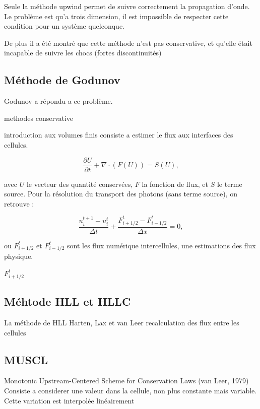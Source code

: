 Seule la méthode upwind permet de suivre correctement la propagation d'onde.
Le problème est qu'a trois dimension, il est impossible de respecter cette condition pour un système quelconque.


De plus il a été montré que cette méthode n'est pas conservative, et qu'elle était incapable de suivre les chocs (fortes discontinuités)

\subsection{Méthode de Godunov}


Godunov  \cite{MR0119433} a répondu a ce problème.

methodes conservative

introduction aux volumes finis
consiste a estimer le flux aux interfaces des cellules.


\begin{equation}
 \frac{\partial U}{\partial t} + \nabla \cdot (F(U)) = S(U), 
\label{eq:rad_generale}
\end{equation}

avec $U$ le vecteur des quantité conservées, $F$ la fonction de flux, et $S$ le terme source. Pour la résolution du transport des photons (sans terme source), on retrouve :

\begin{equation}
\frac{ u^{t+1}_i - u^t_i }{\Delta t} + \frac{ F^t_{i+1/2} - F^t_{i-1/2} }{\Delta x} =0,
\label{eq:rad_solver}
\end{equation}

ou $F^t_{i+1/2}$ et $F^t_{i-1/2}$ sont les flux numérique intercellules, une estimations des flux physique.

$F^t_{i+1/2}$

\subsection{Méhtode HLL et HLLC }
La méthode de HLL Harten, Lax et van Leer 
recalculation des flux entre les cellules

\subsection{MUSCL}
Monotonic Upstream-Centered Scheme for Conservation Laws (van Leer, 1979)
Consiste a considerer une valeur dans la cellule, non plus constante mais variable.
Cette variation est interpolée linéairement

